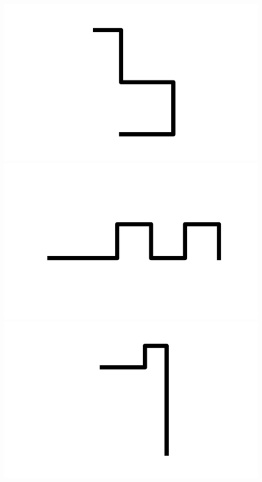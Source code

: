 \documentclass[]{report}
\begin{document}
\includegraphics[scale=.1]{pictures/21/state_cluster_shapes_28.pdf} 
\includegraphics[scale=.1]{pictures/21/state_cluster_shapes_29.pdf} 
\includegraphics[scale=.1]{pictures/21/state_cluster_shapes_30.pdf} 
\end{document}
